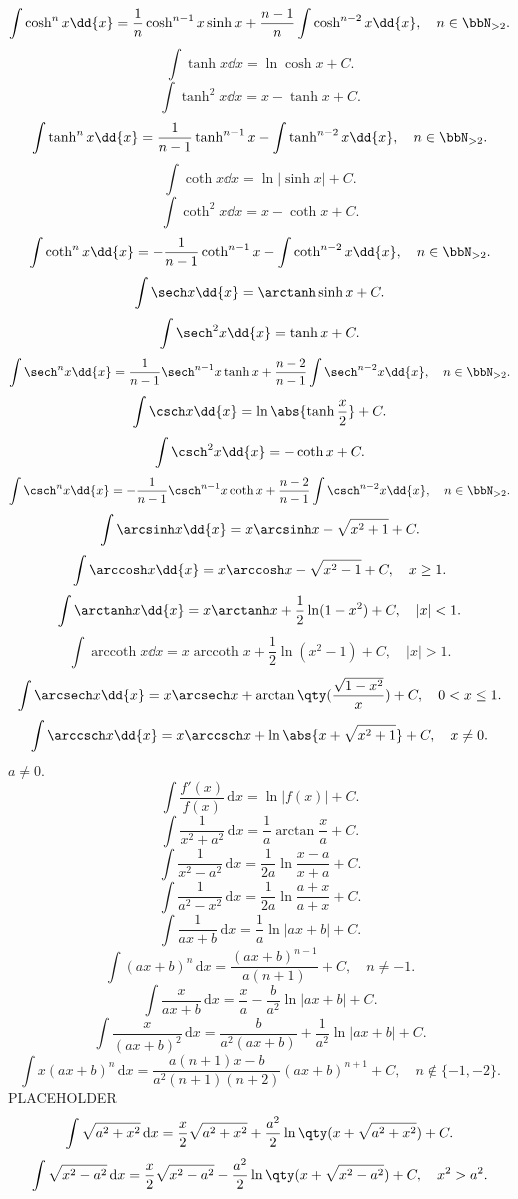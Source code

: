 \documentclass[a4paper,12pt]{report}
\begin{document}
\begin{itemize}
\begin{itemize}
\[\int\cosh^nx\dd{x}=\frac{1}{n}\cosh^{n-1}x\sinh x+\frac{n-1}{n}\int\cosh^{n-2}x\dd{x},\quad n\in\bbN_{>2}.\]
\[\int\tanh x\dd{x}=\ln\cosh x+C.\]
\[\int\tanh^2x\dd{x}=x-\tanh x+C.\]
\[\int\tanh^nx\dd{x}=\frac{1}{n-1}\tanh^{n-1}x-\int\tanh^{n-2}x\dd{x},\quad n\in\bbN_{>2}.\]
\[\int\coth x\dd{x}=\ln|\sinh x|+C.\]
\[\int\coth^2x\dd{x}=x-\coth x+C.\]
\[\int\coth^nx\dd{x}=-\frac{1}{n-1}\coth^{n-1}x-\int\coth^{n-2}x\dd{x},\quad n\in\bbN_{>2}.\]
\[\int\sech x\dd{x}=\arctanh\sinh x+C.\]
\[\int\sech^2x\dd{x}=\tanh x+C.\]
\[\int\sech^nx\dd{x}=\frac{1}{n-1}\sech^{n-1}x\tanh x+\frac{n-2}{n-1}\int\sech^{n-2}x\dd{x},\quad n\in\bbN_{>2}.\]
\[\int\csch x\dd{x}=\ln\abs{\tanh\frac{x}{2}}+C.\]
\[\int\csch^2x\dd{x}=-\coth x+C.\]
\[\int\csch^nx\dd{x}=-\frac{1}{n-1}\csch^{n-1}x\coth x+\frac{n-2}{n-1}\int\csch^{n-2}x\dd{x},\quad n\in\bbN_{>2}.\]
\[\int\arcsinh x\dd{x}=x\arcsinh x-\sqrt{x^2+1}+C.\]
\[\int\arccosh x\dd{x}=x\arccosh x-\sqrt{x^2-1}+C,\quad x\geq 1.\]
\[\int\arctanh x\dd{x}=x\arctanh x+\frac{1}{2}\ln(1-x^2)+C,\quad|x|<1.\]
\[\int\operatorname{arccoth} x\dd{x}=x\operatorname{arccoth} x+\frac{1}{2}\ln(x^2-1)+C,\quad|x|>1.\]
\[\int\arcsech x\dd{x}=x\arcsech x+\arctan\qty(\frac{\sqrt{1-x^2}}{x})+C,\quad 0<x\leq 1.\]
\[\int\arccsch x\dd{x}=x\arccsch x+\ln\abs{x+\sqrt{x^2+1}}+C,\quad x\neq 0.\]
$a\neq 0$.
\[\int\frac{f'(x)}{f(x)}\,\mathrm{d}x=\ln|f(x)|+C.\]
\[\int\frac{1}{x^2+a^2}\,\mathrm{d}x=\frac{1}{a}\arctan\frac{x}{a}+C.\]
\[\int\frac{1}{x^2-a^2}\,\mathrm{d}x=\frac{1}{2a}\ln\frac{x-a}{x+a}+C.\]
\[\int\frac{1}{a^2-x^2}\,\mathrm{d}x=\frac{1}{2a}\ln\frac{a+x}{a+x}+C.\]
\[\int\frac{1}{ax+b}\,\mathrm{d}x=\frac{1}{a}\ln|ax+b|+C.\]
\[\int(ax+b)^n\,\mathrm{d}x=\frac{(ax+b)^{n-1}}{a(n+1)}+C,\quad n\neq -1.\]
\[\int\frac{x}{ax+b}\,\mathrm{d}x=\frac{x}{a}-\frac{b}{a^2}\ln|ax+b|+C.\]
\[\int\frac{x}{(ax+b)^2}\,\mathrm{d}x=\frac{b}{a^2(ax+b)}+\frac{1}{a^2}\ln|ax+b|+C.\]
\[\int x(ax+b)^n\,\mathrm{d}x=\frac{a(n+1)x-b}{a^2(n+1)(n+2)}(ax+b)^{n+1}+C,\quad n\notin\{-1,-2\}.\]
PLACEHOLDER
\[\int\sqrt{a^2+x^2}\,\mathrm{d}x=\frac{x}{2}\sqrt{a^2+x^2}+\frac{a^2}{2}\ln\qty(x+\sqrt{a^2+x^2})+C.\]
\[\int\sqrt{x^2-a^2}\,\mathrm{d}x=\frac{x}{2}\sqrt{x^2-a^2}-\frac{a^2}{2}\ln\qty(x+\sqrt{x^2-a^2})+C,\quad x^2>a^2.\]

\end{itemize}
\end{itemize}
\end{document}

